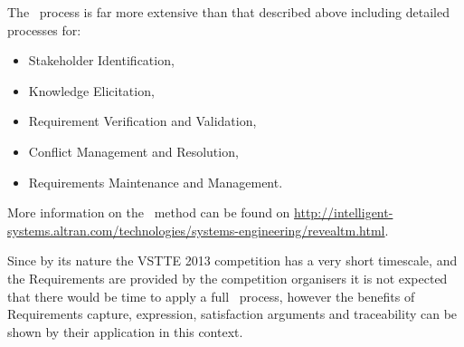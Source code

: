 The \reveal\ process is far more extensive than that
described above including detailed processes for:
\begin{itemize}
\item Stakeholder Identification,
\item Knowledge Elicitation,
\item Requirement Verification and Validation,
\item Conflict Management and Resolution,
\item Requirements Maintenance and Management.
\end{itemize}

More information on the \reveal\ method can be found on
\url{http://intelligent-systems.altran.com/technologies/systems-engineering/revealtm.html}.

Since by its nature the VSTTE 2013 competition has a very short
timescale, and the Requirements are provided by the competition
organisers it is not expected that there would be time to apply a full
\reveal\ process, however the benefits of Requirements
capture, expression, satisfaction arguments and traceability can be
shown by their application in this context.

